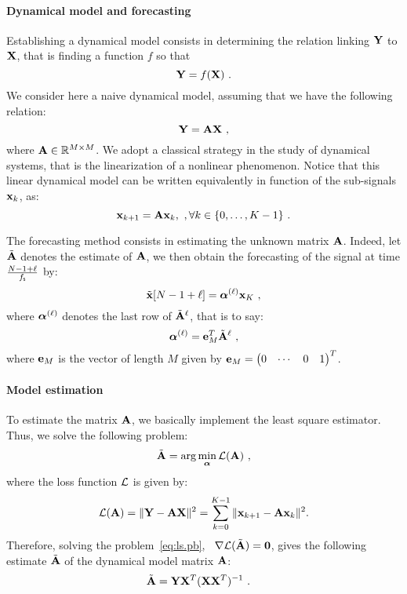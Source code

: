 \paragraph{Dynamical model and forecasting} 
Establishing a dynamical model consists in determining the relation linking ${\mathbf Y}$ to ${\mathbf X}$, that is finding a function $f$ so that
\[
{\mathbf Y} = f({\mathbf X})\ .
\] 
We consider here a naive dynamical model, assuming that we have the following relation:
\begin{equation}
{\mathbf Y} = {\mathbf A}{\mathbf X}\ ,
\label{eq:dyn.model}
\end{equation}
where ${\mathbf A}\in{\mathbb R}^{M\times M}$. We adopt a classical strategy in the study of dynamical systems, that is the linearization of a nonlinear phenomenon. Notice that this linear dynamical model can be written equivalently in function of the sub-signals ${\mathbf x}_k$, as:
\begin{equation}
{\mathbf x}_{k+1} = {\mathbf A}{\mathbf x}_{k},\ ,\forall k\in\{0,\dots,K-1\}\ .
\end{equation}


The forecasting method consists in estimating the unknown matrix ${\mathbf A}$. Indeed, let $\tilde{{\mathbf A}}$ denotes the estimate of ${\mathbf A}$, we then obtain the forecasting of the signal at time $\frac{N-1+\ell}{f_{\mathsf s}}$ by:
\begin{equation}
\label{eq:prediction}
\tilde {{\mathbf x}} [N-1+\ell] = \boldsymbol{\alpha}^{(\ell)}{\mathbf x}_{K}\ ,
\end{equation}  
where $\boldsymbol{\alpha}^{(\ell)}$ denotes the last row of $\tilde{{\mathbf A}}^\ell$, that is to say:
\begin{equation}
\boldsymbol{\alpha}^{(\ell)}={\mathbf e}_M^T\tilde{{\mathbf A}}^\ell\ ,
\label{eq:alpha.l}
\end{equation}
where ${\mathbf e}_M$ is the vector of length $M$ given by ${\mathbf e}_M = \begin{pmatrix} 0 & \cdots & 0 & 1\end{pmatrix}^T$.

\paragraph{Model estimation} To estimate the matrix ${\mathbf A}$, we basically implement the least square estimator. Thus, we solve the following problem:
\begin{equation}
\label{eq:ls.pb}
\tilde{{\mathbf A}} = \arg\min_{\boldsymbol{\alpha}} {\mathcal L}({\mathbf A})\ ,
\end{equation}
where the loss function ${\mathcal L}$ is given by:
\[
{\mathcal L}({\mathbf A}) = \|{\mathbf Y}-{\mathbf A}{\mathbf X}\|^2 = \sum_{k=0}^{K-1} \|{\mathbf x}_{k+1}-{\mathbf A}{\mathbf x}_k\|^2.
\]
Therefore, solving the problem~\eqref{eq:ls.pb}, \ie~$\nabla {\mathcal L}(\tilde{{\mathbf A}})=\boldsymbol{0}$, gives the following estimate $\tilde{{\mathbf A}}$ of the dynamical model matrix ${\mathbf A}$:
\begin{align}
\tilde{{\mathbf A}} &= {\mathbf Y}{\mathbf X}^T({\mathbf X}{\mathbf X}^T)^{-1}\ .
\label{eq:lse}
\end{align}

